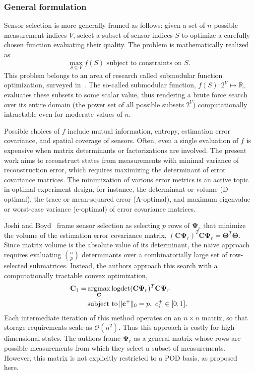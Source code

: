 \documentclass[letterpaper]{IEEEtran}
\newcommand{\bc}{\mathbf{c}}
\newcommand{\bC}{\mathbf{C}}
\newcommand{\bPsi}{\mathbf{\Psi}}
\newcommand{\bTheta}{\mathbf{\Theta}}
\newcommand{\reals}{\mathbb{R}}
\DeclareMathOperator*{\argmax}{arg\rm{}max}
\DeclareMathOperator*{\logdet}{log\rm{}det}
\DeclareMathOperator*{\subjto}{subject~to}
\begin{document}
{\subsubsection{General formulation}
Sensor selection is more generally framed as follows: given a set of $n$ possible measurement indices $V$, select a subset of sensor indices $S$ to optimize a carefully chosen function evaluating their quality. The problem is mathematically realized as 
\begin{equation}
\max_{S\subseteq V} f(S) \mbox{ subject to constraints on }S.
\end{equation}
This problem belongs to an area of research called submodular function optimization, surveyed in~\cite{Krause2012submodular}. The so-called submodular function, ${f(S):2^V\mapsto\reals}$, evaluates these subsets to some scalar value, thus rendering a brute force search over its entire domain (the power set of all possible subsets $2^V$) computationally intractable even for moderate values of $n$. 

Possible choices of $f$ include mutual information, entropy, estimation error covariance, and spatial coverage of sensors. Often, even a single evaluation of $f$ is expensive when matrix determinants or factorizations are involved. The present work aims to reconstruct states from measurements with minimal variance of reconstruction error, which requires maximizing the determinant of error covariance matrices. The minimization of various error metrics is an active topic in optimal experiment design, for instance, the determinant or volume (D-optimal), the trace or mean-squared error (A-optimal), and maximum eigenvalue or worst-case variance (e-optimal) of error covariance matrices. 

Joshi and Boyd~\cite{Joshi2009ieee} frame sensor selection as selecting $p$ rows of $\bPsi_r$ that minimize the volume of the estimation error covariance matrix, $(\bC\bPsi_r)^T\bC\bPsi_r=\bTheta^T\bTheta$. Since matrix volume is the absolute value of its determinant, the naive approach requires evaluating $n\choose p$ determinants over a combinatorially large set of row-selected submatrices. 
Instead, the authors approach this search with a computationally tractable convex optimization,
\begin{align}
\label{eqn:sensor_opt_l1}
\bC_1 = &\argmax_\bC \logdet (\bC\bPsi_r)^T\bC\bPsi_r \nonumber \\
&\subjto \|\bc^+\|_0=p,~  c_i^+ \in [0,1].
\end{align}
Each intermediate iteration of this method operates on an $n\times n$ matrix, so that storage requirements scale as $\mathcal{O}(n^2)$. Thus this approach is costly for high-dimensional states. The authors frame $\bPsi_r$ as a general matrix whose rows are possible measurements from which they select a subset of measurements. However, this matrix is not explicitly restricted to a POD basis, as proposed here.
} %
\end{document}
